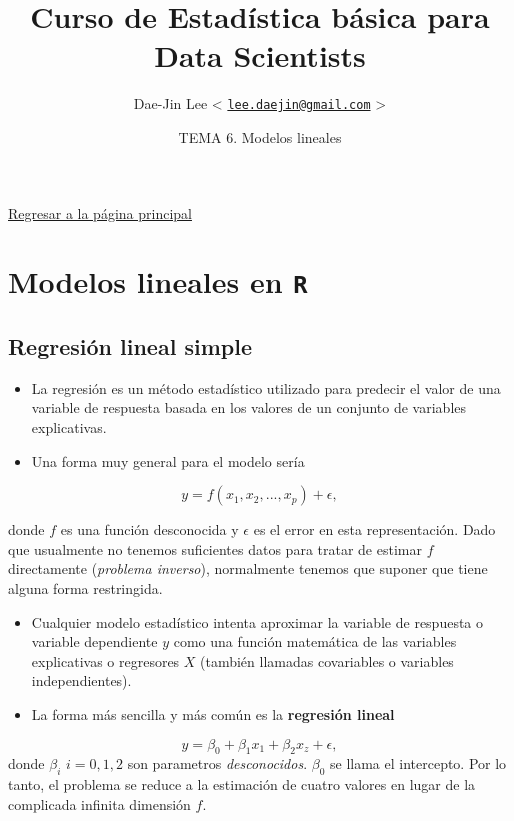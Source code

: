 \documentclass[]{article}
\title{\textbf{Curso de Estadística básica para Data Scientists}}
\author{Dae-Jin Lee \textless{}
\href{mailto:lee.daejin@gmail.com}{\nolinkurl{lee.daejin@gmail.com}}
\textgreater{}}
\date{TEMA 6. Modelos lineales}
\numberwithin{equation}{section}
\begin{document}
\maketitle

{
\hypersetup{linkcolor=black}
\setcounter{tocdepth}{2}
\tableofcontents
}
\newpage

\href{https://idaejin.github.io/bcam-courses/R/datahack/}{Regresar a la
página principal}

\section{\texorpdfstring{Modelos lineales en
\texttt{R}}{Modelos lineales en R}}\label{modelos-lineales-en-r}

\subsection{Regresión lineal simple}\label{regresion-lineal-simple}

\begin{itemize}
\item
  La regresión es un método estadístico utilizado para predecir el valor
  de una variable de respuesta basada en los valores de un conjunto de
  variables explicativas.
\item
  Una forma muy general para el modelo sería
\end{itemize}

\[
      y = f(x_1,x_2,...,x_p) + \epsilon,
\]

donde \(f\) es una función desconocida y \(\epsilon\) es el error en
esta representación. Dado que usualmente no tenemos suficientes datos
para tratar de estimar \(f\) directamente (\emph{problema inverso}),
normalmente tenemos que suponer que tiene alguna forma restringida.

\begin{itemize}
\item
  Cualquier modelo estadístico intenta aproximar la variable de
  respuesta o variable dependiente \(y\) como una función matemática de
  las variables explicativas o regresores \(X\) (también llamadas
  covariables o variables independientes).
\item
  La forma más sencilla y más común es la \textbf{regresión lineal}
\end{itemize}

\[
    y = \beta_0 + \beta_1 x_1 + \beta_2 x_z + \epsilon,
\] donde \(\beta_i\) \(i=0,1,2\) son parametros \emph{desconocidos}.
\(\beta_0\) se llama el intercepto. Por lo tanto, el problema se reduce
a la estimación de cuatro valores en lugar de la complicada infinita
dimensión \(f\).
\end{document}
